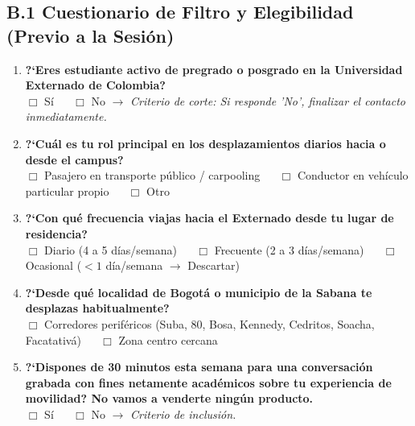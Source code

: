 \documentclass[11pt,a4paper]{article}
\begin{document}
\subsection{B.1 Cuestionario de Filtro y Elegibilidad (Previo a la Sesi\'on)}
\begin{enumerate}[leftmargin=*]
    \item \textbf{?`Eres estudiante activo de pregrado o posgrado en la Universidad Externado de Colombia?} \\
    $\Box$ S\'i $\quad$ $\Box$ No $\longrightarrow$ \textit{Criterio de corte: Si responde 'No', finalizar el contacto inmediatamente.}
    \item \textbf{?`Cu\'al es tu rol principal en los desplazamientos diarios hacia o desde el campus?} \\
    $\Box$ Pasajero en transporte p\'ublico / carpooling $\quad$ $\Box$ Conductor en veh\'iculo particular propio $\quad$ $\Box$ Otro
    \item \textbf{?`Con qu\'e frecuencia viajas hacia el Externado desde tu lugar de residencia?} \\
    $\Box$ Diario (4 a 5 d\'ias/semana) $\quad$ $\Box$ Frecuente (2 a 3 d\'ias/semana) $\quad$ $\Box$ Ocasional ($<1$ d\'ia/semana $\longrightarrow$ Descartar)
    \item \textbf{?`Desde qu\'e localidad de Bogot\'a o municipio de la Sabana te desplazas habitualmente?} \\
    $\Box$ Corredores perif\'ericos (Suba, 80, Bosa, Kennedy, Cedritos, Soacha, Facatativ\'a) $\quad$ $\Box$ Zona centro cercana
    \item \textbf{?`Dispones de 30 minutos esta semana para una conversaci\'on grabada con fines netamente acad\'emicos sobre tu experiencia de movilidad? No vamos a venderte ning\'un producto.} \\
    $\Box$ S\'i $\quad$ $\Box$ No $\longrightarrow$ \textit{Criterio de inclusi\'on.}
\end{enumerate}
\end{document}
